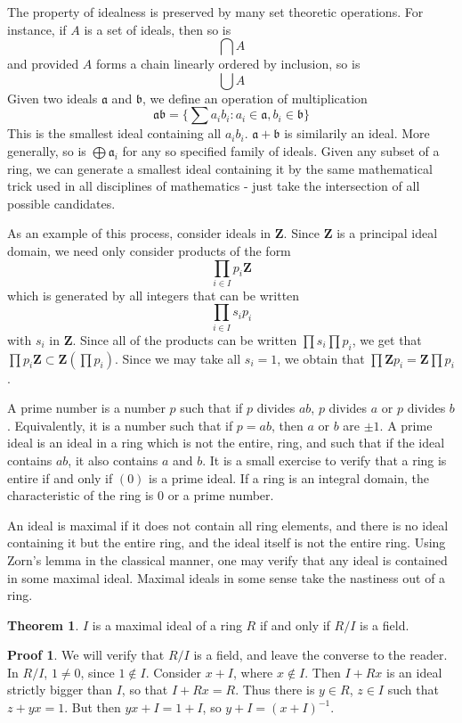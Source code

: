\documentclass[12pt]{amsbook}
\theoremstyle{definition}
\newtheorem{theorem}{Theorem}[chapter]
\newtheorem*{prf}{Proof}
\begin{document}
The property of idealness is preserved by many set theoretic operations. For instance, if $A$ is a set of ideals, then so is
%
\[ \bigcap A \]
%
and provided $A$ forms a chain linearly ordered by inclusion, so is
%
\[ \bigcup A \]
%
Given two ideals $\mathfrak{a}$ and $\mathfrak{b}$, we define an operation of multiplication
%
\[ \mathfrak{a} \mathfrak{b} = \{ \sum a_i b_i : a_i \in \mathfrak{a}, b_i \in \mathfrak{b} \} \]
%
This is the smallest ideal containing all $a_i b_i$. $\mathfrak{a} + \mathfrak{b}$ is similarily an ideal. More generally, so is $\bigoplus \mathfrak{a}_i$ for any so specified family of ideals. Given any subset of a ring, we can generate a smallest ideal containing it by the same mathematical trick used in all disciplines of mathematics - just take the intersection of all possible candidates.

As an example of this process, consider ideals in $\mathbf{Z}$. Since $\mathbf{Z}$ is a principal ideal domain, we need only consider products of the form
%
\[ \prod_{i \in I} p_i \mathbf{Z} \]
%
which is generated by all integers that can be written
%
\[ \prod_{i \in I} s_i p_i \]
%
with $s_i$ in $\mathbf{Z}$. Since all of the products can be written $\prod s_i \prod p_i$, we get that $\prod p_i \mathbf{Z} \subset \mathbf{Z}(\prod p_i)$. Since we may take all $s_i = 1$, we obtain that $\prod \mathbf{Z} p_i = \mathbf{Z} \prod p_i$.

A prime number is a number $p$ such that if $p$ divides $ab$, $p$ divides $a$ or $p$ divides $b$. Equivalently, it is a number such that if $p = ab$, then $a$ or $b$ are $\pm 1$. A prime ideal is an ideal in a ring which is not the entire, ring, and such that if the ideal contains $ab$, it also contains $a$ and $b$. It is a small exercise to verify that a ring is entire if and only if $(0)$ is a prime ideal. If a ring is an integral domain, the characteristic of the ring is $0$ or a prime number.

An ideal is maximal if it does not contain all ring elements, and there is no ideal containing it but the entire ring, and the ideal itself is not the entire ring. Using Zorn's lemma in the classical manner, one may verify that any ideal is contained in some maximal ideal. Maximal ideals in some sense take the nastiness out of a ring.

\begin{theorem}
    $I$ is a maximal ideal of a ring $R$ if and only if $R/I$ is a field.
\end{theorem}
\begin{prf}
    We will verify that $R/I$ is a field, and leave the converse to the reader. In $R/I$, $1 \neq 0$, since $1 \not\in I$. Consider $x + I$, where $x \not\in I$. Then $I + Rx$ is an ideal strictly bigger than $I$, so that $I + Rx = R$. Thus there is $y \in R$, $z \in I$ such that $z + yx = 1$. But then $yx + I = 1 + I$, so $y + I = (x + I)^{-1}$.
\end{prf}
\end{document}
